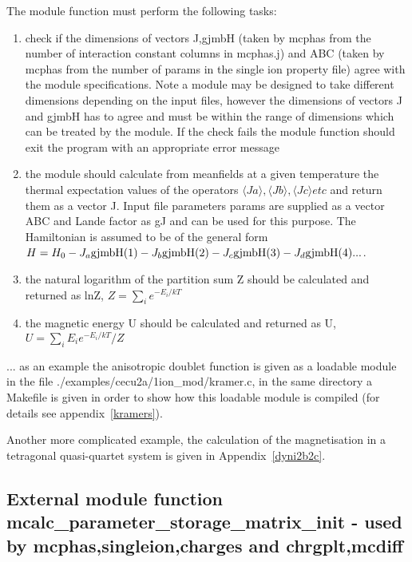 The module function must perform the following tasks:
\begin{enumerate}
\item check if the dimensions of vectors J,gjmbH (taken by {\prg mcphas} from the number of 
interaction constant columns in {\prg mcphas.j})
 and ABC (taken by {\prg mcphas} from the number of params in the single ion property
file) agree with the module specifications. Note a module may be designed to 
take different dimensions depending on the input files, however the dimensions
of vectors J and gjmbH has to agree and must be within the range of dimensions which
can be treated by the module. If the check fails the module function should exit the
program with an appropriate error message
\item the module should calculate from meanfields at a given temperature the 
thermal expectation values of the operators $\langle Ja\rangle, \langle Jb\rangle,\langle Jc\rangle etc$ and return them as
a vector J. Input file parameters params are supplied as a vector ABC and
Lande factor as gJ and  can be used for this purpose. The Hamiltonian
is assumed to be of the general form $H=H_0-J_a {\rm gjmbH}(1) -J_b {\rm gjmbH}(2) -J_c {\rm gjmbH}(3) -J_d {\rm %
gjmbH}(4) ...$.
\item the natural logarithm of the partition sum Z should be calculated and returned as lnZ,
$Z=\sum_i e^{-E_i/kT}$
\item the magnetic energy U should be calculated and returned as U, $U=\sum_i E_i e^{-E_i/kT}/Z$
\end{enumerate}

... as an example the anisotropic doublet function is given as a
loadable module in the file {\prg ./examples/cecu2a/1ion\_mod/kramer.c}, in the same
directory a Makefile is given in order to show how this loadable
module is compiled (for details see appendix~\ref{kramers}).

Another more complicated example, the calculation of the magnetisation
in a tetragonal quasi-quartet system is given in Appendix~\ref{dyni2b2c}.

\subsection{External module function {\prg mcalc\_parameter\_storage\_matrix\_init} - used by {\prg %
mcphas},{\prg singleion},{\prg charges} and {\prg %
chrgplt},{\prg mcdiff}  }

